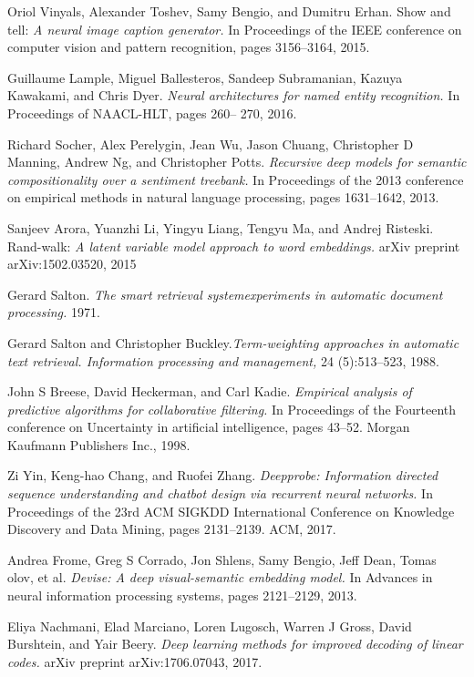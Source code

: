 \documentclass[11pt]{article}
\begin{document}
\begin{thebibliography}{9}
Oriol Vinyals, Alexander Toshev, Samy Bengio, and Dumitru Erhan. Show and tell: \textit{A neural
image caption generator.} In Proceedings of the IEEE conference on computer vision and pattern
recognition, pages 3156–3164, 2015.

Guillaume Lample, Miguel Ballesteros, Sandeep Subramanian, Kazuya Kawakami, and Chris Dyer.
\textit{Neural architectures for named entity recognition.} In Proceedings of NAACL-HLT, pages 260–
270, 2016.

Richard Socher, Alex Perelygin, Jean Wu, Jason Chuang, Christopher D Manning, Andrew Ng, and
Christopher Potts. \textit{Recursive deep models for semantic compositionality over a sentiment treebank.} In Proceedings of the 2013 conference on empirical methods in natural language processing,
pages 1631–1642, 2013.

Sanjeev Arora, Yuanzhi Li, Yingyu Liang, Tengyu Ma, and Andrej Risteski. Rand-walk: \textit{A latent
variable model approach to word embeddings.} arXiv preprint arXiv:1502.03520, 2015

Gerard Salton. \textit{The smart retrieval systemexperiments in automatic document processing.} 1971.

Gerard Salton and Christopher Buckley.\textit{Term-weighting approaches in automatic text retrieval.
Information processing and management,} 24 (5):513–523, 1988.


John S Breese, David Heckerman, and Carl Kadie. \textit{Empirical analysis of predictive algorithms for
collaborative filtering.} In Proceedings of the Fourteenth conference on Uncertainty in artificial
intelligence, pages 43–52. Morgan Kaufmann Publishers Inc., 1998.

Zi Yin, Keng-hao Chang, and Ruofei Zhang. \textit{Deepprobe: Information directed sequence understanding and chatbot design via recurrent neural networks.} In Proceedings of the 23rd ACM
SIGKDD International Conference on Knowledge Discovery and Data Mining, pages 2131–2139.
ACM, 2017.

Andrea Frome, Greg S Corrado, Jon Shlens, Samy Bengio, Jeff Dean, Tomas 	olov, et al. \textit{Devise:
A deep visual-semantic embedding model.} In Advances in neural information processing systems,
pages 2121–2129, 2013.

Eliya Nachmani, Elad Marciano, Loren Lugosch, Warren J Gross, David Burshtein, and Yair Beery.
\textit{Deep learning methods for improved decoding of linear codes.} arXiv preprint arXiv:1706.07043,
2017.


\end{thebibliography}
\end{document}
